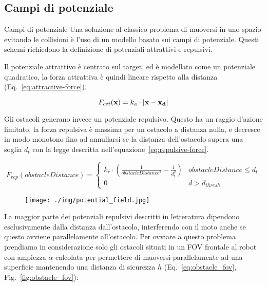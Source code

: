 \documentclass[10pt]{beamer}
\begin{document}
	\subsection{Campi di potenziale}\label{subsec:Campi-di-potenziale}
	\begin{frame}[allowframebreaks]{Campi di potenziale}
	Una soluzione al classico problema di muoversi in uno spazio evitando le
	collisioni è l'uso di un modello basato sui campi di potenziale. Questi
	schemi richiedono la definizione di potenziali attrattivi e repulsivi.
		
	Il potenziale attrattivo è centrato sul target, ed è modellato come un
	potenziale quadratico, la forza attrattiva è quindi lineare rispetto alla
	distanza (Eq.~\ref{eq:attractive-force}).

	\begin{equation}\label{eq:attractive-force}
		F_{att}( \textbf{x}) = k_a\cdot \left| {\bf x - x_d} \right| 
	\end{equation}


	Gli ostacoli generano invece un potenziale repulsivo. Questo ha un raggio
	d'azione limitato, la forza repulsiva è massima per un ostacolo a distanza
	nulla, e decresce in modo monotono fino ad annullarsi se la distanza
	dell'ostacolo supera una soglia $d_t$ con la legge descritta
	nell'equazione~\ref{eq:repulsive-force}.

	\begin{equation}\label{eq:repulsive-force}
		F_{rep}(obstacleDistance) = \begin{cases}
			k_r \cdot \left(
				\frac{1}{obstacleDistance^2}-
				\frac{1}{d_t^2}
			\right)  & obstacleDistance \leq d_{t} \\
			0 & d > d_{thresh}
		\end{cases}
	\end{equation}
	
	\begin{figure}[H]
		\centering
		\texttt{[image: ./img/potential\_field.jpg]}
		\label{fig:potential_field}
	\end{figure}

	La maggior parte dei potenziali repulsivi descritti in letteratura
	dipendono esclusivamente dalla distanza dall'ostacolo, interferendo con il
	moto anche se questo avviene parallelamente all'ostacolo. Per ovviare a
	questo problema prendiamo in considerazione solo gli ostacoli situati in un
	FOV frontale al robot con ampiezza $ \alpha  $ calcolata per permettere di
	muoversi parallelamente ad una superficie mantenendo una distanza di
	sicurezza $ h $ (Eq.~\ref{eq:obstacle_fov}, Fig.~\ref{fig:obstacle_fov}): 


\end{frame}
\end{document}
